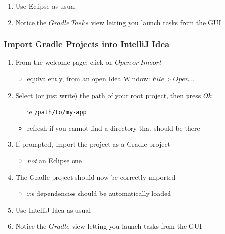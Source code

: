 \documentclass[presentation]{beamer}\mode<presentation>{\usetheme{AMSBolognaFC}}
\begin{document}
\begin{frame}[c,allowframebreaks]
\begin{enumerate}
		\medskip

		\item Use Eclipse as usual

		\medskip

		\item Notice the $Gradle\ Tasks$ view letting you launch tasks from the GUI

	\end{enumerate}

\end{frame}

\startExercise

\begin{frame}%
	\frametitle{Import Gradle Projects into IntelliJ Idea}

	\begin{enumerate}
		\item From the welcome page: click on $Open\ or\ Import$
		\begin{itemize}
			\item equivalently, from an open Idea Window: $File > Open\ldots$
		\end{itemize}

		\medskip

		\item Select (or just write) the path of your root project, then press $Ok$
		\begin{itemize}
			\item[ie] \texttt{/path/to/\alert{my-app}}
			\item refresh if you cannot find a directory that should be there
		\end{itemize}

		\medskip

		\item If prompted, import the project as a Gradle project
		\begin{itemize}
			\item \emph{not} an Eclipse one
		\end{itemize}

		\medskip

		\item The Gradle project should now be correctly imported
		\begin{itemize}
			\item its dependencies should be automatically loaded
		\end{itemize}

		\medskip

		\item Use IntelliJ Idea as usual

		\medskip

		\item Notice the $Gradle$ view letting you launch tasks from the GUI

	\end{enumerate}

\end{frame}
\end{document}
